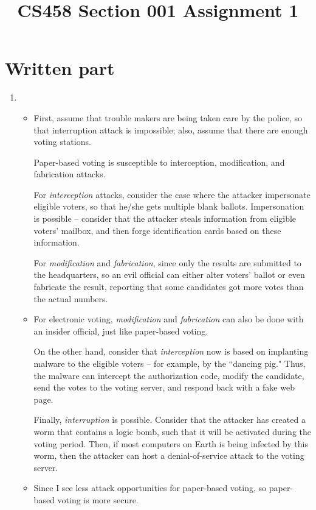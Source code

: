 \documentclass[12pt]{article}
\title{CS458 Section 001 Assignment 1}
\begin{document}
\maketitle

\section*{Written part}

\begin{enumerate}
\item
\begin{itemize}
\item
First, assume that trouble makers are being taken care by the police, so that interruption attack is impossible; also, assume that there are enough voting stations.

Paper-based voting is susceptible to interception, modification, and fabrication attacks.

For \emph{interception} attacks, consider the case where the attacker impersonate eligible voters, so that he/she gets multiple blank ballots.
Impersonation is possible -- consider that the attacker steals information from eligible voters' mailbox, and then forge identification cards based on these information.

For \emph{modification} and \emph{fabrication}, since only the results are submitted to the headquarters, so an evil official can either alter voters' ballot or even fabricate the result, reporting that some candidates got more votes than the actual numbers.
\item
For electronic voting, \emph{modification} and \emph{fabrication} can also be done with an insider official, just like paper-based voting.

On the other hand, consider that \emph{interception} now is based on implanting malware to the eligible voters -- for example, by the ``dancing pig."
Thus, the malware can intercept the authorization code, modify the candidate, send the votes to the voting server, and respond back with a fake web page.

Finally, \emph{interruption} is possible.
Consider that the attacker has created a worm that contains a logic bomb, such that it will be activated during the voting period.
Then, if most computers on Earth is being infected by this worm, then the attacker can host a denial-of-service attack to the voting server.
\item
Since I see less attack opportunities for paper-based voting, so paper-based voting is more secure.
\end{itemize}
\done


\end{enumerate}
\end{document}
